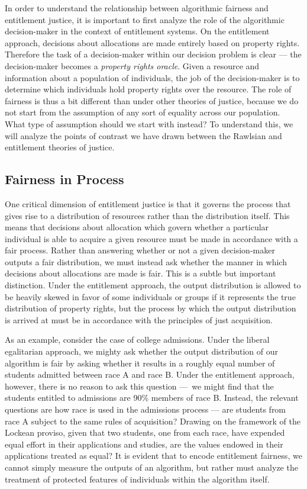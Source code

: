 In order to understand the relationship between algorithmic fairness and
entitlement justice, it is important to first analyze the role of the
algorithmic decision-maker in the context of entitlement systems. On the 
entitlement approach, decisions about allocations are made entirely based on
property rights. Therefore the task of a decision-maker within our decision
problem is clear — the decision-maker becomes a \emph{property rights oracle}.
Given a resource and information about a population of individuals, the job of
the decision-maker is to determine which individuals hold property rights over
the resource. The role of fairness is thus a bit different than under other
theories of justice, because we do not start from the assumption of any sort of
equality across our population. What type of assumption should we start with 
instead? To understand this, we will analyze the points of contrast we have
drawn between the Rawlsian and entitlement theories of justice.

\subsection{Fairness in Process}

One critical dimension of entitlement justice is that it governs the process
that gives rise to a distribution of resources rather than the distribution
itself. This means that decisions about allocation which govern whether a
particular individual is able to acquire a given resource must be made in
accordance with a fair process. Rather than answering whether or not a given
decision-maker outputs a fair distribution, we must instead ask whether the
manner in which decisions about allocations are made is fair. This is a
subtle but important distinction. Under the entitlement approach, the output
distribution is allowed to be heavily skewed in favor of some individuals or
groups if it represents the true distribution of property rights, but the
process by which the output distribution is arrived at must be in accordance
with the principles of just acquisition.

As an example, consider the case of college admissions. Under the liberal
egalitarian approach, we mighty ask whether the output distribution of our
algorithm is fair by asking whether it results in a roughly equal number of
students admitted between race A and race B. Under the entitlement approach,
however, there is no reason to ask this question — we might find that the
students entitled to admissions are 90\% members of race B. Instead, the
relevant questions are how race is used in the admissions process  — are
students from race A subject to the same rules of acquisition? Drawing on the
framework of the Lockean proviso, given that two students, one from each race,
have expended equal effort in their applications and studies, are the values
endowed in their applications treated as equal? It is evident that to encode
entitlement fairness, we cannot simply measure the outputs of an algorithm, but
rather must analyze the treatment of protected features of individuals within
the algorithm itself.

